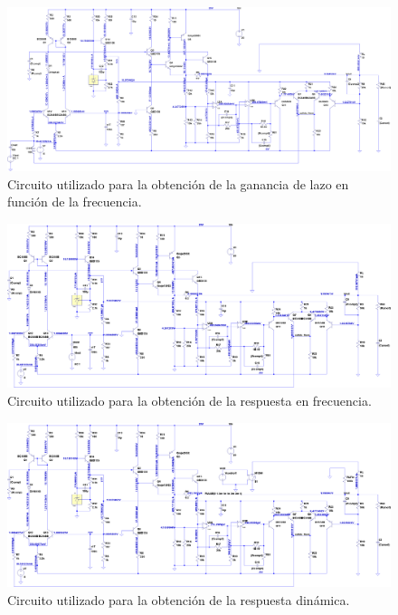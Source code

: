 \clearpage


\begin{figure}[H] %
\begin{center}
\includegraphics[width=1.2 \textwidth, angle=90]{./img/desarrollo/power_supply_LOOP.png}
\caption{\label{fig:fig_complete_circuit_loop}\footnotesize{Circuito utilizado para la obtención de la ganancia de lazo en función de la frecuencia.}}
\end{center}
\end{figure}

\clearpage

\begin{figure}[H] %
\begin{center}
\includegraphics[width=1.2 \textwidth, angle=90]{./img/desarrollo/power_supply_RF.png}
\caption{\label{fig:fig_complete_circuit_rf}\footnotesize{Circuito utilizado para la obtención de la respuesta en frecuencia.}}
\end{center}
\end{figure}

\clearpage

\begin{figure}[H] %
\begin{center}
\includegraphics[width=1.2 \textwidth, angle=90]{./img/desarrollo/power_supply_STEP.png}
\caption{\label{fig:fig_complete_circuit_step}\footnotesize{Circuito utilizado para la obtención de la respuesta dinámica.}}
\end{center}
\end{figure}